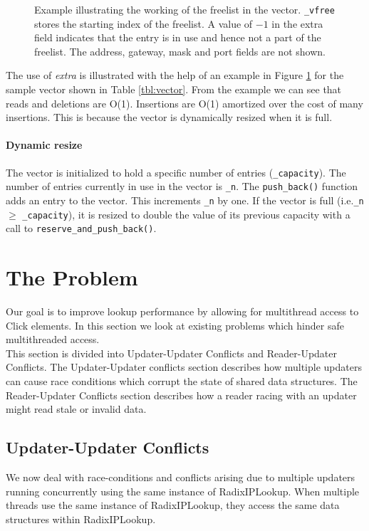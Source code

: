 \documentclass[a4paper,marginparwidth=50pt,marginparsep=10pt]{article}
\begin{document}
\begin{figure}[tph]
\begin{center}
\begin{tabular}{|p{2.5in} c|}
\hline
\end{tabular}
\cprotect\caption{Example illustrating the working of the freelist in the vector. \verb+_vfree+ stores the starting index of the freelist. A value of $-1$ in the extra field indicates that the entry is in use and hence not a part of the freelist. The address, gateway, mask and port fields are not shown.}
\label{fig:freelisteg}
\end{center}
\end{figure}


The use of \emph{extra} is illustrated with the help of an example in Figure \ref{fig:freelisteg} for the sample vector shown in Table \ref{tbl:vector}. From the example we can see that reads and deletions are O(1). Insertions are O(1) amortized over the cost of many insertions. This is because the vector is dynamically resized when it is full.\\

\paragraph{Dynamic resize}
The vector is initialized to hold a specific number of entries (\verb+_capacity+). The number of entries currently in use in the vector is \verb+_n+. The \verb+push_back()+ function adds an entry to the vector. This increments \verb$_n$ by one. If the vector is full (i.e.\verb+_n+ $\ge$ \verb+_capacity+), it is resized to double the value of its previous capacity with a call to \verb+reserve_and_push_back()+.

\section{The Problem}
\label{sec:problem}
Our goal is to improve lookup performance by allowing for multithread access to Click elements. In this section we look at existing problems which hinder safe multithreaded access.\\

This section is divided into Updater-Updater Conflicts and Reader-Updater Conflicts. The Updater-Updater conflicts section describes how multiple updaters can cause race conditions which corrupt the state of shared data structures. The Reader-Updater Conflicts section describes how a reader racing with an updater might read stale or invalid data.
\subsection{Updater-Updater Conflicts}
We now deal with race-conditions and conflicts arising due to multiple updaters running concurrently using the same instance of RadixIPLookup. When multiple threads use the same instance of RadixIPLookup, they access the same data structures within RadixIPLookup.
\end{document}
